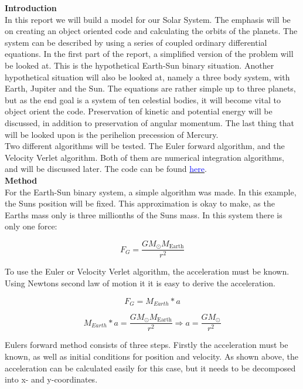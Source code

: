 \documentclass[10pt,a4paper]{article}
\begin{document}
{\LARGE\bf
Introduction
}\\

\noindent In this report we will build a model for our Solar System. The emphasis will be on creating an object oriented code and calculating the orbits of the planets. The system can be described by using a series of coupled ordinary differential equations. In the first part of the report, a simplified version of the problem will be looked at. This is the hypothetical Earth-Sun binary situation. Another hypothetical situation will also be looked at, namely a three body system, with Earth, Jupiter and the Sun. The equations are rather simple up to three planets, but as the end goal is a system of ten celestial bodies, it will become vital to object orient the code. Preservation of kinetic and potential energy will be discussed, in addition to preservation of angular momentum. The last thing that will be looked upon is the perihelion precession of Mercury. \\

\noindent Two different algorithms will be tested. The Euler forward algorithm, and the Velocity Verlet algorithm. Both of them are numerical integration algorithms, and will be discussed later. The code can be found \href{https://github.com/VemundStenbekkThorkildsen/Assigment3}{\textcolor{blue}{here}}. \\   





{\LARGE\bf
Method
}\\

\noindent For the Earth-Sun binary system, a simple algorithm was made. In this example, the Suns position will be fixed. This approximation is okay to make, as the Earths mass only is three millionths of the Suns mass. In this system there is only one force:


$$
F_G=\frac{GM_{\odot}M_{\mathrm{Earth}}}{r^2}
$$

\noindent To use the Euler or Velocity Verlet algorithm, the acceleration must be known. Using Newtons second law of motion it it is easy to derive the acceleration. 


$$F_G=M_{Earth}*a $$

$$M_{Earth}*a=\frac{GM_{\odot}M_{\mathrm{Earth}}}{r^2} \Rightarrow a=\frac{GM_{\odot}}{r^2}$$

\noindent Eulers forward method consists of three steps. Firstly the acceleration must be known, as well as initial conditions for position and velocity. As shown above, the acceleration can be calculated easily for this case, but it needs to be decomposed into x- and y-coordinates. 
\end{document}
